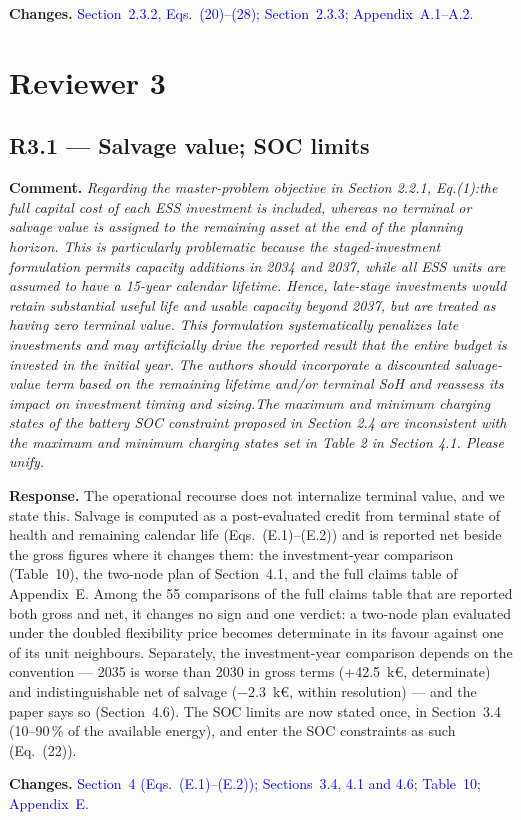 \documentclass[11pt]{article}
\newcommand{\rcomment}[1]{\par\medskip\noindent\textbf{Comment.} \textit{#1}\par\smallskip}
\newcommand{\rresponse}[1]{\noindent\textbf{Response.} #1\par\smallskip}
\newcommand{\rchanges}[1]{\noindent\textbf{Changes.} \textcolor{blue}{#1}\par\medskip}
\begin{document}
\rchanges{
    Section~2.3.2, Eqs.~(20)--(28); Section~2.3.3; Appendix~A.1--A.2.
}

\section*{Reviewer 3}

\subsection*{R3.1 --- Salvage value; SOC limits}
\rcomment{
Regarding the master-problem objective in Section 2.2.1, Eq.(1):the full capital cost of each ESS investment is included, whereas no terminal or salvage value is assigned to the remaining asset at the end of the planning horizon. This is particularly problematic because the staged-investment formulation permits capacity additions in 2034 and 2037, while all ESS units are assumed to have a 15-year calendar lifetime. Hence, late-stage investments would retain substantial useful life and usable capacity beyond 2037, but are treated as having zero terminal value. This formulation systematically penalizes late investments and may artificially drive the reported result that the entire budget is invested in the initial year. The authors should incorporate a discounted salvage-value term based on the remaining lifetime and/or terminal SoH and reassess its impact on investment timing and sizing.The maximum and minimum charging states of the battery SOC constraint proposed in Section 2.4 are inconsistent with the maximum and minimum charging states set in Table 2 in Section 4.1. Please unify.
}
\rresponse{The operational recourse does not internalize terminal value, and we state this. Salvage is computed as a post-evaluated credit from terminal state of health and remaining calendar life (Eqs.~(E.1)--(E.2)) and is reported net beside the gross figures where it changes them: the investment-year comparison (Table~10), the two-node plan of Section~4.1, and the full claims table of Appendix~E. 
Among the 55 comparisons of the full claims table that are reported both gross and net, it changes no sign and one verdict: a two-node plan evaluated under the doubled flexibility price becomes determinate in its favour against one of its unit neighbours. Separately, the investment-year comparison depends on the convention --- 2035 is worse than 2030 in gross terms (+42.5~k\euro{}, determinate) and indistinguishable net of salvage ($-2.3$~k\euro{}, within resolution) --- and the paper says so (Section~4.6). The SOC limits are now stated once, in Section~3.4 (10--90\,\% of the available energy), and enter the SOC constraints as such (Eq.~(22)).}
\rchanges{Section~4 (Eqs.~(E.1)--(E.2)); Sections~3.4, 4.1 and 4.6; Table~10; Appendix~E.}
\end{document}
